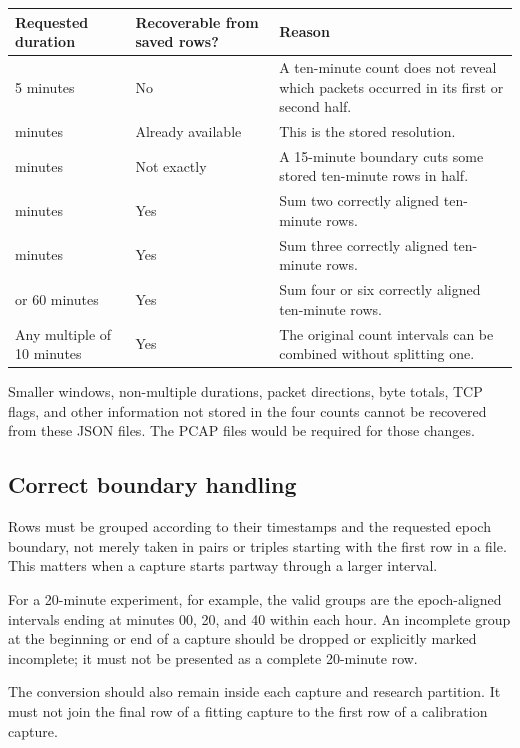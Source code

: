 \documentclass[11pt,a4paper]{article}
\begin{document}
\begin{table}[htbp]
\centering
\small
\begin{tabular}{p{}p{}p{}}
\toprule
Requested duration & Recoverable from saved rows? & Reason \\
\midrule
5 minutes
& No
& A ten-minute count does not reveal which packets occurred in its first or
  second half. \\
\addlinespace
10 minutes
& Already available
& This is the stored resolution. \\
\addlinespace
15 minutes
& Not exactly
& A 15-minute boundary cuts some stored ten-minute rows in half. \\
\addlinespace
20 minutes
& Yes
& Sum two correctly aligned ten-minute rows. \\
\addlinespace
30 minutes
& Yes
& Sum three correctly aligned ten-minute rows. \\
\addlinespace
40 or 60 minutes
& Yes
& Sum four or six correctly aligned ten-minute rows. \\
\addlinespace
Any multiple of 10 minutes
& Yes
& The original count intervals can be combined without splitting one. \\
\bottomrule
\end{tabular}
\end{table}

Smaller windows, non-multiple durations, packet directions, byte totals, TCP
flags, and other information not stored in the four counts cannot be recovered
from these JSON files.  The PCAP files would be required for those changes.

\subsection{Correct boundary handling}

Rows must be grouped according to their timestamps and the requested epoch
boundary, not merely taken in pairs or triples starting with the first row in a
file.  This matters when a capture starts partway through a larger interval.

For a 20-minute experiment, for example, the valid groups are the epoch-aligned
intervals ending at minutes 00, 20, and 40 within each hour.  An incomplete
group at the beginning or end of a capture should be dropped or explicitly
marked incomplete; it must not be presented as a complete 20-minute row.

The conversion should also remain inside each capture and research partition.
It must not join the final row of a fitting capture to the first row of a
calibration capture.
\end{document}
